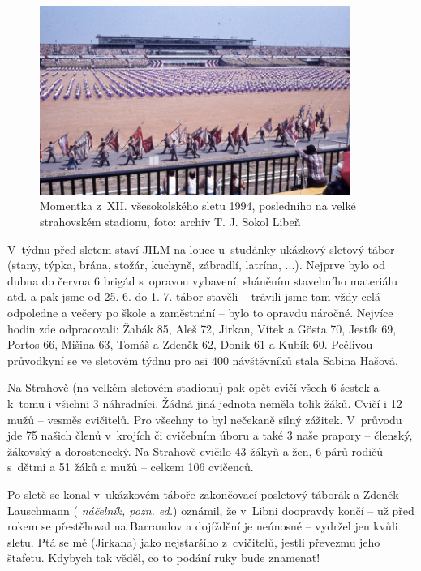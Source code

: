 \documentclass[a5paper, 11pt, twoside]{article}
\newcommand{\pozned}[1]{%
\textit{#1}}
\begin{document}
\begin{figure}[h!]
  \centering 
  \includegraphics[width=0.9\textwidth]{img/44_slet_strahov.jpg}
  \caption*{Momentka z~XII. všesokolského sletu 1994, posledního na velké
  strahovském stadionu, foto: archiv T. J. Sokol Libeň}
\end{figure}

V~týdnu před sletem staví JILM na louce u~studánky ukázkový sletový
tábor (stany, týpka, brána, stožár, kuchyně, zábradlí, latrína, ...).
Nejprve bylo od dubna do června 6 brigád s~opravou vybavení, sháněním
stavebního materiálu atd. a pak jsme od 25. 6. do 1. 7. tábor stavěli --
trávili jsme tam vždy celá odpoledne a večery po škole a zaměstnání --
bylo to opravdu náročné. Nejvíce hodin zde odpracovali: Žabák 85, Aleš
72, Jirkan, Vítek a Gösta 70, Jestík 69, Portos 66, Mišina 63, Tomáš a
Zdeněk 62, Doník 61 a Kubík 60. Pečlivou průvodkyní se ve sletovém týdnu
pro asi 400 návštěvníků stala Sabina Hašová.

Na Strahově (na velkém sletovém stadionu) pak opět cvičí všech 6 šestek
a k~tomu i všichni 3 náhradníci. Žádná jiná jednota neměla tolik žáků.
Cvičí i 12 mužů -- vesměs cvičitelů. Pro všechny to byl nečekaně silný
zážitek. V~průvodu jde 75 našich členů v~krojích či cvičebním úboru a
také 3 naše prapory -- členský, žákovský a dorostenecký. Na Strahově
cvičilo 43 žákyň a žen, 6 párů rodičů s~dětmi a 51 žáků a mužů -- celkem
106 cvičenců.

Po sletě se konal v~ukázkovém táboře zakončovací posletový táborák a
Zdeněk Lauschmann (\pozned{náčelník, pozn. ed.}) oznámil, že v~Libni
doopravdy končí -- už před rokem se přestěhoval na Barrandov a dojíždění
je neúnosné -- vydržel jen kvůli sletu. Ptá se mě (Jirkana) jako
nejstaršího z~cvičitelů, jestli převezmu jeho štafetu. Kdybych tak
věděl, co to podání ruky bude znamenat!
\end{document}
